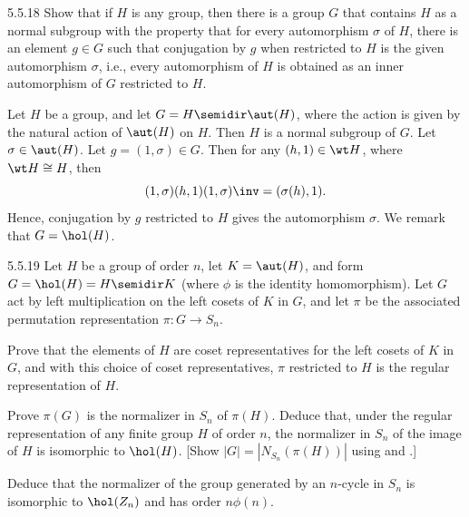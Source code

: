 \begin{spex}{5.5.18}
    Show that if $H$ is any group, then there is a group $G$ that contains $H$ as a normal subgroup with the property that for every automorphism $\sigma$ of $H$, there is an element $g \in G$ such that conjugation by $g$ when restricted to $H$ is the given automorphism $\sigma$, i.e., every automorphism of $H$ is obtained as an inner automorphism of $G$ restricted to $H$.
\end{spex}

\begin{sol}[spsol]
    Let $H$ be a group, and let $G = H \semidir \aut(H)$, where the action is given by the natural action of $\aut(H)$ on $H$.
	Then $H$ is a normal subgroup of $G$.
	Let $\sigma \in \aut(H)$.
	Let $g = (1, \sigma) \in G$.
	Then for any $(h, 1) \in \wt H$, where $\wt H \cong H$, then
    \[
    	(1, \sigma)(h, 1)(1, \sigma)\inv = ( \sigma(h), 1).
    \]
    Hence, conjugation by $g$ restricted to $H$ gives the automorphism $\sigma$.
	We remark that $G = \hol(H)$.
\end{sol}

\begin{exercise}{5.5.19}
    Let $H$ be a group of order $n$, let $K = \aut(H)$, and form $G = \hol(H) = H \semidir K$ (where $\phi$ is the identity homomorphism).
	Let $G$ act by left multiplication on the left cosets of $K$ in $G$, and let $\pi$ be the associated permutation representation $\pi : G \to S_n$.
    \begin{subexercises}
        \item Prove that the elements of $H$ are coset representatives for the left cosets of $K$ in $G$, and with this choice of coset representatives, $\pi$ restricted to $H$ is the regular representation of $H$.
        \item Prove $\pi(G)$ is the normalizer in $S_n$ of $\pi(H)$.
	    Deduce that, under the regular representation of any finite group $H$ of order $n$, the normalizer in $S_n$ of the image of $H$ is isomorphic to $\hol(H)$. [Show $|G| = |N_{S_n}(\pi(H))|$ using  and .]
        \item Deduce that the normalizer of the group generated by an $n$-cycle in $S_n$ is isomorphic to $\hol(Z_n)$ and has order $n\phi(n)$.
    \end{subexercises}
\end{exercise}


